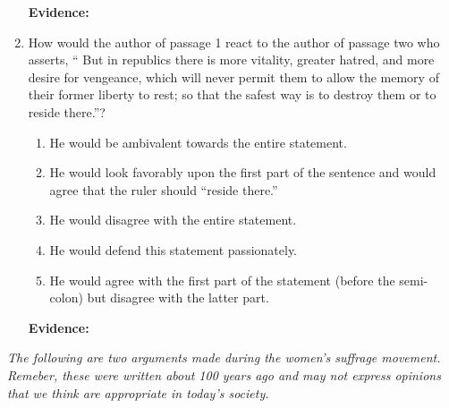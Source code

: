 \begin{enumerate}
\bigskip
\textbf{Evidence:} \hrulefill

\bigskip
\item How would the author of passage 1 react to the author of passage two who asserts, `` But in republics there is more vitality, greater hatred, and more desire for vengeance, which will never permit them to allow the memory of their former liberty to rest; so that the safest way is to destroy them or to reside there.''?

\bigskip
\begin{enumerate}[label=(\Alph*)]
\item He would be ambivalent towards the entire statement. 
\item He would look favorably upon the first part of the sentence and would agree that the ruler should ``reside there.''
\item He would disagree with the entire statement.
\item He would defend this statement passionately. 
\item He would agree with the first part of the statement (before the semi-colon) but disagree with the latter part. 
\end{enumerate}

\bigskip
\textbf{Evidence:} \hrulefill

\end{enumerate}

\bigskip
\textit{The following are two arguments made during the women's suffrage movement. Remeber, these were written about 100 years ago and may not express opinions that we think are appropriate in today's society.}

